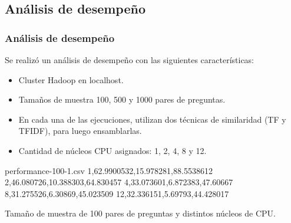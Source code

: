 \subsection{Análisis de desempeño}
\begin{frame}
	\frametitle{Análisis de desempeño}
	Se realizó un análisis de desempeño con las siguientes características:
	\begin{itemize}
		\item Cluster Hadoop en localhost.
		\item Tamaños de muestra 100, 500 y 1000 pares de preguntas.
		\item En cada una de las ejecuciones, utilizan dos técnicas de similaridad (TF y TFIDF), para luego ensamblarlas.
		\item Cantidad de núcleos CPU asignados: 1, 2, 4, 8 y 12.
	\end{itemize}

	\framebreak

	\begin{filecontents*}{performance-100-1.csv}
		1,62.9900532,15.978281,88.5538612
		2,46.080726,10.388303,64.830457
		4,33.073601,6.872383,47.60667
		8,31.275526,6.30869,45.023509
		12,32.336151,5.69793,44.428017
	\end{filecontents*}

	\footnotesize
	Tamaño de muestra de 100 pares de preguntas y distintos núcleos de CPU.
	\begin{figure}[h!]
		\centering
		\scriptsize
		\label{fig:performance100}
	\end{figure}


\end{frame}
